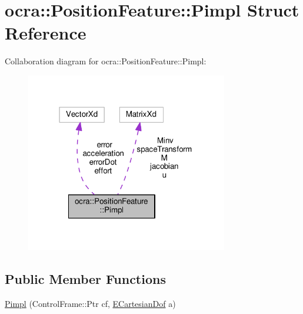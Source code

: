 \hypertarget{structocra_1_1PositionFeature_1_1Pimpl}{}\section{ocra\+:\+:Position\+Feature\+:\+:Pimpl Struct Reference}
\label{structocra_1_1PositionFeature_1_1Pimpl}


Collaboration diagram for ocra\+:\+:Position\+Feature\+:\+:Pimpl\+:
\nopagebreak
\begin{figure}[H]
\begin{center}
\leavevmode
\includegraphics[width=250pt]{d0/d59/structocra_1_1PositionFeature_1_1Pimpl__coll__graph}
\end{center}
\end{figure}
\subsection*{Public Member Functions}
\begin{DoxyCompactItemize}
\item 
\hyperlink{structocra_1_1PositionFeature_1_1Pimpl_ad886f374a5f070290519a8ccbaff9ab8}{Pimpl} (Control\+Frame\+::\+Ptr cf, \hyperlink{namespaceocra_a436781c7059a0f76027df1c652126260}{E\+Cartesian\+Dof} a)
\end{DoxyCompactItemize}
